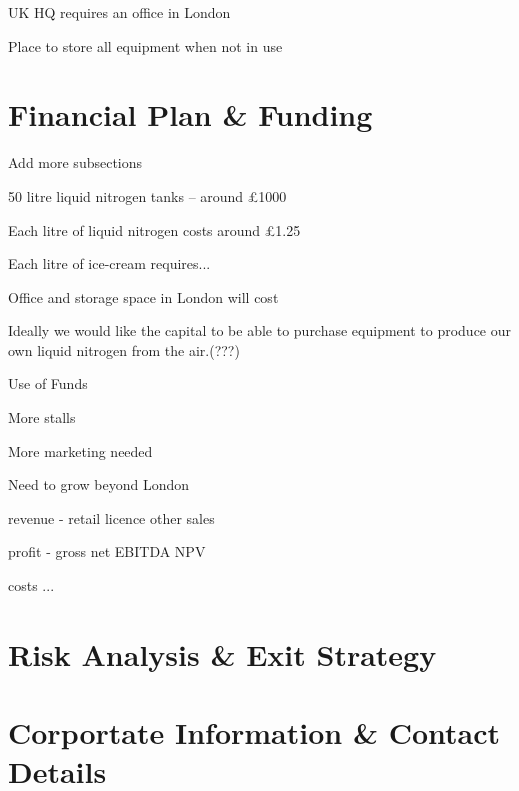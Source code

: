 \documentclass{article}
\begin{document}
UK HQ requires an office in London

Place to store all equipment when not in use


\section{Financial Plan \& Funding}
Add more subsections

50 litre liquid nitrogen tanks – around £1000

Each litre of liquid nitrogen costs around £1.25

Each litre of ice-cream requires...

Office and storage space in London will cost

Ideally we would like the capital to be able to purchase equipment to
produce our own liquid nitrogen from the air.(???)

Use of Funds

More stalls

More marketing needed

Need to grow beyond London

revenue
 - retail
   licence
   other sales

profit
 - gross
   net
   EBITDA
   NPV

costs
 ...

\section{Risk Analysis \& Exit Strategy}



\section{Corportate Information \& Contact Details}
\end{document}
